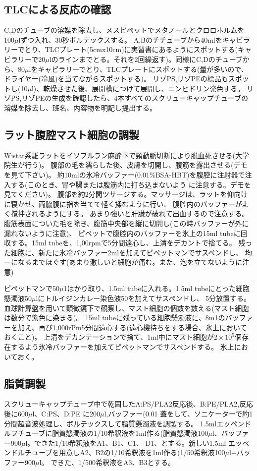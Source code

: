 \documentclass[a4paper,papersize,dvipdfmx]{jsarticle}
\begin{document}
\subsection*{TLCによる反応の確認}

C,Dのチューブの溶媒を除去し、メスピペットでメタノールとクロロホルムを100$\mu$lずつ入れ、30秒ボルテックスする。
A,Bのチチューブから40mlをキャビラリーでとり、TLCプレート(5cmx10cm)に実習書にあるようにスポットする(キャビラリーで20$\mu$lのラインまでとる。それを2回繰返す)。同様にC,Dのチューブから、80$\mu$lをキャピラリーでとり、TLCプレートにスポットする(量が多いので、ドライヤー(冷風)を当てながらスポットする)。
リゾPS,リゾPEの標品もスポットし(10$\mu$l)、乾燥させた後、展開槽につけて展開し、ニンヒドリン発色する。
リゾPS,リゾPEの生成を確認したら、4本すべてのスクリューキャップチューブの溶媒を除去し、班名、内容物を明記し提出する。

\subsection*{ラット腹腔マスト細胞の調製}
Wistar系雄ラットをイソフルラン麻酔下で頸動脈切断により脱血死させる(大学院生が行う)。
腹部の毛を濡らした後、皮膚を切開し、腹筋を露出させる(デモを見て下さい)。
約10mlの氷冷バッファー(0.01$\%$BSA-HBT)を腹腔に注射器で注入する(このとき、胃や腸または腹筋内に打ち込まないよう
に注意する。デモを見てください)。
腹部を約2分間ツサージする。マッサージは、ラットを仰向けに寝かせ、両脇腹に指を当てて軽く揉むように行い、
腹腔内のバッファーがよく撹拌されるようにする。
あまり強いと肝臓が破れて出血するので注意する。
腹筋表面についた毛を除き、腹筋中央部を縦に切開し(この時バッファーが外に漏れないように注意)、
ピペットで腹腔内のバッファーを氷上の15ml tubeに回収する。15ml tubeを、1,00rpmで5分間遠心し、上清をデカントで捨てる。
残った細胞に、新たに氷冷バッファー2mlを加えてピペットマンでサスペンドし、
均一になるまでほぐす(あまり激しいと細胞が痛む。また、泡を立てないように注意)


ピペットマンで50$\mu$1はかり取り、1.5ml tubeに入れる。1.5ml tubeにとった細胞懸濁液50$\mu$lにトルイジンカレー染色液50を加えてサスペンドし、
5分放置する。血球計算盤を用いて顕微鏡下で観察し、マスト細胞の個数を数える(マスト細胞は数分で紫色に染まる)。
15ml tubeに残っている細胞懸濁液に、8m1のバッファーを加え、再び1,000rPm5分間遠心する(遠心機待ちをする場合、氷上においておくこと)。
上清をデカンテーションで捨て、1ml中にマスト細胞が$2\times10^5$個存在するよう氷冷バッファーを加えてピペットマンでサスペンドする。
氷上においておく。


\subsection*{脂質調製}
スクリューキャップチューブ中で乾固したA:PS/PLA2反応後、B:PE/PLA2,反応後に600$\mu$l、C:PS、D:PE
に200$\mu$l,バッファー(0.01%
蓋をして、ソニケーターで約1分間超音波処理し、ボルテックスして脂質懸濁液を調製する。
1.5mlエッペンドルフチューブに脂質懸濁液の1/10希釈液を1ml作る(脂質懸濁液100$\mu$l、バッファー900$\mu$l。できた1/10希釈液をA1、B1、C1、
D1、とする。新しい1.5ml エッペンドルチューブを用意しA2、B2の1/10希釈液を1ml作る(1/50希釈液100$\mu$l+バッファー900$\mu$l。
できた、1/500希釈液をA3、B3とする。
\end{document}
